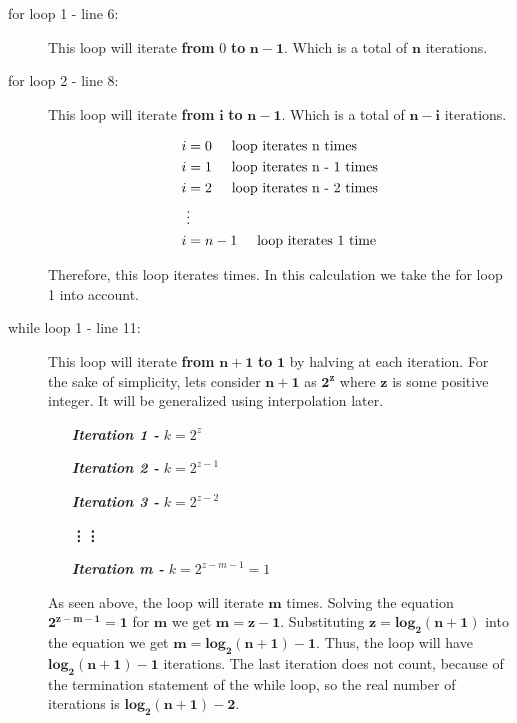 \documentclass[10pt]{article}
\begin{document}
\begin{description}
   \item[for loop 1 - line 6:] This loop will iterate \textbf{from} $0$ \textbf{to}  $\mathbf{n-1}$. Which is a total of $\mathbf{n}$ iterations. 
   
   \item[for loop 2 - line 8:] This loop will iterate \textbf{from} $\mathbf{i}$ \textbf{to}  $\mathbf{n-1}$. Which is a total of $\mathbf{n-i}$ iterations. 

    \begin{align*}
    i &= 0 \text{\hspace{0.5cm}loop iterates n times} \\
    i &= 1 \text{\hspace{0.5cm}loop iterates n - 1 times}\\
    i &= 2 \text{\hspace{0.5cm}loop iterates n - 2 times}\\
    &\vdots \\
    i &= n - 1 \text{\hspace{0.5cm}loop iterates 1 time} \\
    \end{align*}

    Therefore, this loop iterates  times. In this calculation we take the for loop 1 into account.

   \item[while loop 1 - line 11:] This loop will iterate \textbf{from} $\mathbf{n+1}$ \textbf{to} $\mathbf{1}$ by halving at each iteration. For the sake of simplicity, lets consider $\mathbf{n+1}$ as $\mathbf{2^{z}}$ where $\mathbf{z}$ is some positive integer. It will be generalized using interpolation later.
   \begin{enumerate}[leftmargin=3cm]
       \item[\textit{\textbf{Iteration 1 -}}] ${k = 2^{z}}$
       \item[\textit{\textbf{Iteration 2 -}}] ${k = 2^{z-1}}$
       \item[\textit{\textbf{Iteration 3 -}}] ${k = 2^{z-2}}$
       \item[]\hspace{-1.5cm}\textbf{\vdots}\hspace{2cm}\textbf{\vdots}
       \item[\textit{\textbf{Iteration m -}}] ${k = 2^{z-m-1} = 1}$
   \end{enumerate}
  As seen above, the loop will iterate $\mathbf{m}$ times. Solving the equation $\mathbf{2^{z-m-1} = 1}$ for $\mathbf{m}$ we get $\mathbf{m = z - 1}$. Substituting $\mathbf{z = log_2(n+1)}$ into the equation we get $\mathbf{m = log_2(n+1) - 1}$. Thus, the loop will have $\mathbf{log_2(n+1) - 1}$ iterations. The last iteration does not count, because of the termination statement of the while loop, so the real number of iterations is $\mathbf{log_2(n+1) - 2}$.


\end{description}
\end{document}
